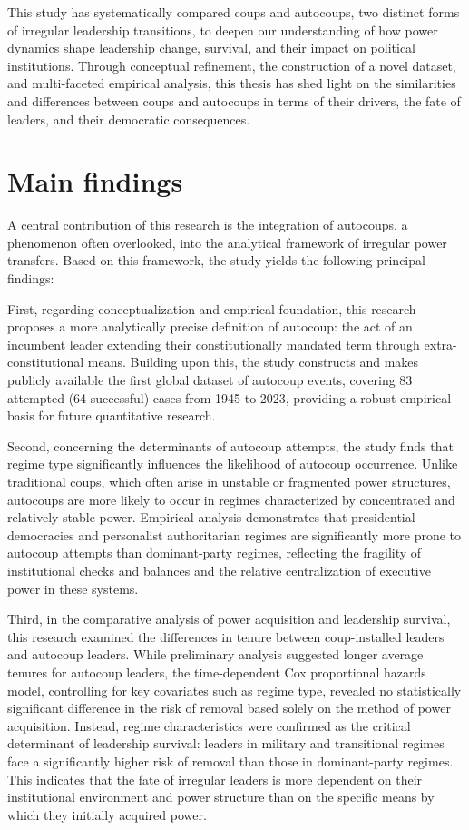 \documentclass[
  12pt,
]{report}
\begin{document}
This study has systematically compared coups and autocoups, two distinct
forms of irregular leadership transitions, to deepen our understanding
of how power dynamics shape leadership change, survival, and their
impact on political institutions. Through conceptual refinement, the
construction of a novel dataset, and multi-faceted empirical analysis,
this thesis has shed light on the similarities and differences between
coups and autocoups in terms of their drivers, the fate of leaders, and
their democratic consequences.

\section{Main findings}\label{main-findings}

A central contribution of this research is the integration of autocoups,
a phenomenon often overlooked, into the analytical framework of
irregular power transfers. Based on this framework, the study yields the
following principal findings:

First, regarding conceptualization and empirical foundation, this
research proposes a more analytically precise definition of autocoup:
the act of an incumbent leader extending their constitutionally mandated
term through extra-constitutional means. Building upon this, the study
constructs and makes publicly available the first global dataset of
autocoup events, covering 83 attempted (64 successful) cases from 1945
to 2023, providing a robust empirical basis for future quantitative
research.

Second, concerning the determinants of autocoup attempts, the study
finds that regime type significantly influences the likelihood of
autocoup occurrence. Unlike traditional coups, which often arise in
unstable or fragmented power structures, autocoups are more likely to
occur in regimes characterized by concentrated and relatively stable
power. Empirical analysis demonstrates that presidential democracies and
personalist authoritarian regimes are significantly more prone to
autocoup attempts than dominant-party regimes, reflecting the fragility
of institutional checks and balances and the relative centralization of
executive power in these systems.

Third, in the comparative analysis of power acquisition and leadership
survival, this research examined the differences in tenure between
coup-installed leaders and autocoup leaders. While preliminary analysis
suggested longer average tenures for autocoup leaders, the
time-dependent Cox proportional hazards model, controlling for key
covariates such as regime type, revealed no statistically significant
difference in the risk of removal based solely on the method of power
acquisition. Instead, regime characteristics were confirmed as the
critical determinant of leadership survival: leaders in military and
transitional regimes face a significantly higher risk of removal than
those in dominant-party regimes. This indicates that the fate of
irregular leaders is more dependent on their institutional environment
and power structure than on the specific means by which they initially
acquired power.
\end{document}
